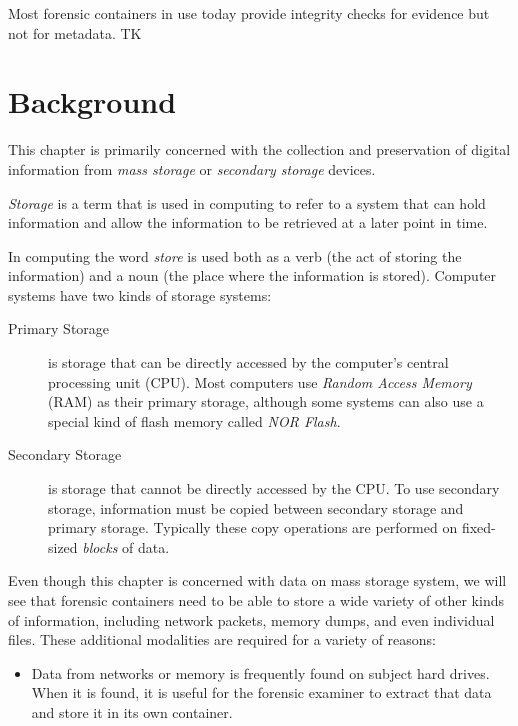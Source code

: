 Most forensic containers in use today provide integrity checks for
evidence but not for metadata. TK

\section{Background}

This chapter is primarily concerned  with the collection and preservation of
digital information from \emph{mass storage} or \emph{secondary
  storage} devices. 

\emph{Storage} is a term that is used in computing to refer to a
system that can hold information and allow the information to be
retrieved at a later point in time. 

In computing the word \emph{store}
is used both as a verb (the act of storing the information) and a noun
(the place where the information is stored). Computer systems have two
kinds of storage systems:

\begin{description}
\item[Primary Storage] is storage that can be directly accessed by the
  computer's central processing unit (CPU). Most computers use
  \emph{Random Access Memory} (RAM) as their primary storage, although
  some systems can also use a special kind of flash memory called
  \emph{NOR Flash}. 

\item[Secondary Storage] is storage that cannot be directly accessed
  by the CPU. To use secondary storage, information must be copied
  between secondary storage and primary storage. Typically these copy
  operations are performed on fixed-sized \emph{blocks} of data.
\end{description}

Even though this chapter is concerned with data on mass
storage system, we will see that forensic containers need to be able
to store a wide variety of other kinds of information, including
network packets, memory dumps, and even individual files. These
additional modalities are required for a variety of reasons:

\begin{itemize}
\item Data from networks or memory is frequently found on subject hard
  drives. When it is found, it is useful for the forensic examiner to
  extract that data and store it in its own container. 
\end{itemize}

